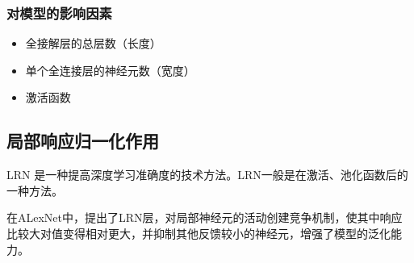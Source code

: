 \documentclass[UTF8]{ctexart}
\begin{document}
\subsubsection{对模型的影响因素}
\begin{itemize}
	\item 全接解层的总层数（长度）
	\item 单个全连接层的神经元数（宽度）
	\item 激活函数
\end{itemize}

\subsection{局部响应归一化作用}
LRN 是一种提高深度学习准确度的技术方法。LRN一般是在激活、池化函数后的一种方法。
\par 在ALexNet中，提出了LRN层，对局部神经元的活动创建竞争机制，使其中响应比较大对值变得相对更大，并抑制其他反馈较小的神经元，增强了模型的泛化能力。
\end{document}
